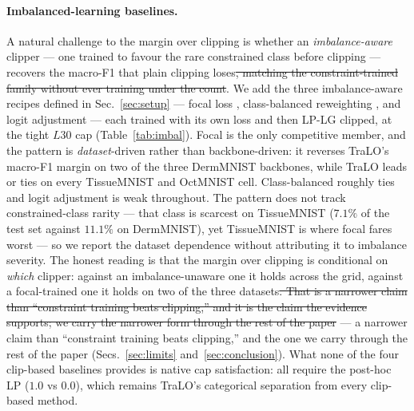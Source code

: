 \documentclass[10pt]{article}
\newcommand{\del}[1]{{\color{red}\sout{#1}}}
\begin{document}
{\color{blue}
\paragraph{Imbalanced-learning baselines.}
A natural challenge to the margin over clipping is whether an \emph{imbalance-aware}
clipper --- one trained to favour the rare constrained class before clipping ---
recovers the macro-F1 that plain clipping loses\del{, matching the constraint-trained
family without ever training under the count}. We add the three imbalance-aware recipes
defined in Sec.~\ref{sec:setup} --- focal loss \citep{lin2017focal}, class-balanced
reweighting \citep{cui2019class}, and logit adjustment \citep{menon2020long} --- each
trained with its own loss and then LP-LG clipped, at the tight $L30$ cap
(Table~\ref{tab:imbal}). Focal is the only competitive member, and the pattern is
\emph{dataset}-driven rather than backbone-driven: it reverses TraLO's macro-F1 margin on
two of the three DermMNIST backbones, while TraLO leads or ties on every TissueMNIST and
OctMNIST cell. Class-balanced roughly ties and logit adjustment is weak throughout. The
pattern does not track constrained-class rarity --- that class is scarcest on TissueMNIST
($7.1\%$ of the test set against $11.1\%$ on DermMNIST), yet TissueMNIST is where focal
fares worst --- so we report the dataset dependence without attributing it to imbalance
severity. The honest reading is that the margin over clipping is conditional on
\emph{which} clipper: against an imbalance-unaware one it holds across the grid, against a
focal-trained one it holds on two of the three datasets\del{. That is a narrower claim than
``constraint training beats clipping,'' and it is the claim the evidence supports; we carry
the narrower form through the rest of the paper}{ --- a narrower claim than
``constraint training beats clipping,'' and the one we carry through the rest of the paper} (Secs.~\ref{sec:limits}
and~\ref{sec:conclusion}).
What none of the four clip-based baselines provides is
native cap satisfaction: all require the post-hoc LP ($1.0$ vs $0.0$), which remains
TraLO's categorical separation from every clip-based method.}
\end{document}
